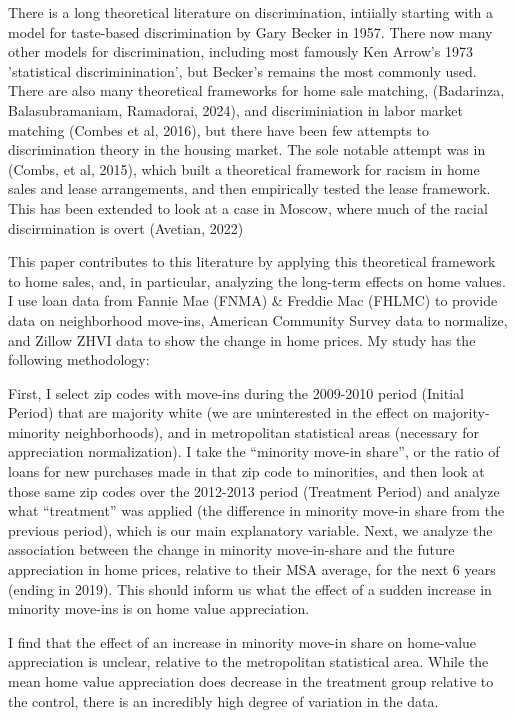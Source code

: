 \documentclass[11pt]{article}
\begin{document}
There is a long theoretical literature on discrimination, intiially starting with a model for taste-based discrimination by Gary Becker in 1957. There now many other models for discrimination, including most famously Ken Arrow's 1973 'statistical discriminination', but Becker's remains the most commonly used. There are also many theoretical frameworks for home sale matching, (Badarinza, Balasubramaniam, Ramadorai, 2024), and discriminiation in labor market matching (Combes et al, 2016), but there have been few attempts to discrimination theory in the housing market. The sole notable attempt was in (Combs, et al, 2015), which built a theoretical framework for racism in home sales and lease arrangements, and then empirically tested the lease framework. This has been extended to look at a case in Moscow, where much of the racial discirmination is overt (Avetian, 2022)

This paper contributes to this literature by applying this theoretical framework to home sales, and, in particular, analyzing the long-term effects on home values. I use loan data from Fannie Mae (FNMA) \& Freddie Mac (FHLMC) to provide data on
neighborhood move-ins, American Community Survey data to normalize, and
Zillow ZHVI data to show the change in home prices. My study has the
following methodology:

First, I select zip codes with move-ins during the 2009-2010 period
(Initial Period) that are majority white (we are uninterested in the
effect on majority-minority neighborhoods), and in metropolitan
statistical areas (necessary for appreciation normalization). I take the
``minority move-in share'', or the ratio of loans for new purchases made
in that zip code to minorities, and then look at those same zip codes
over the 2012-2013 period (Treatment Period) and analyze what
``treatment'' was applied (the difference in minority move-in share from
the previous period), which is our main explanatory variable. Next, we
analyze the association between the change in minority move-in-share and
the future appreciation in home prices, relative to their MSA average,
for the next 6 years (ending in 2019). This should inform us what the
effect of a sudden increase in minority move-ins is on home value
appreciation.

I find that the effect of an increase in minority move-in share on
home-value appreciation is unclear, relative to the metropolitan
statistical area. While the mean home value appreciation does decrease
in the treatment group relative to the control, there is an incredibly
high degree of variation in the data.
\end{document}
